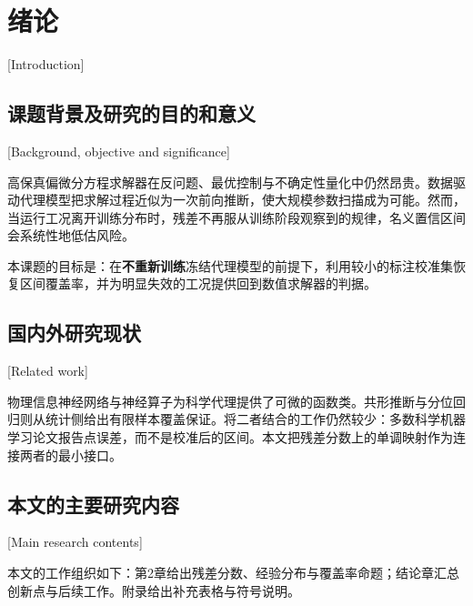 \chapter{绪\hspace{1em}论}[Introduction]

\section{课题背景及研究的目的和意义}[Background, objective and significance]

高保真偏微分方程求解器在反问题、最优控制与不确定性量化中仍然昂贵。数据驱动代理模型把求解过程近似为一次前向推断，使大规模参数扫描成为可能。然而，当运行工况离开训练分布时，残差不再服从训练阶段观察到的规律，名义置信区间会系统性地低估风险。

本课题的目标是：在\textbf{不重新训练}冻结代理模型的前提下，利用较小的标注校准集恢复区间覆盖率，并为明显失效的工况提供回到数值求解器的判据。

\section{国内外研究现状}[Related work]

物理信息神经网络与神经算子为科学代理提供了可微的函数类。共形推断与分位回归则从统计侧给出有限样本覆盖保证。将二者结合的工作仍然较少：多数科学机器学习论文报告点误差，而不是校准后的区间。本文把残差分数上的单调映射作为连接两者的最小接口。

\section{本文的主要研究内容}[Main research contents]

本文的工作组织如下：第2章给出残差分数、经验分布与覆盖率命题；结论章汇总创新点与后续工作。附录给出补充表格与符号说明。
